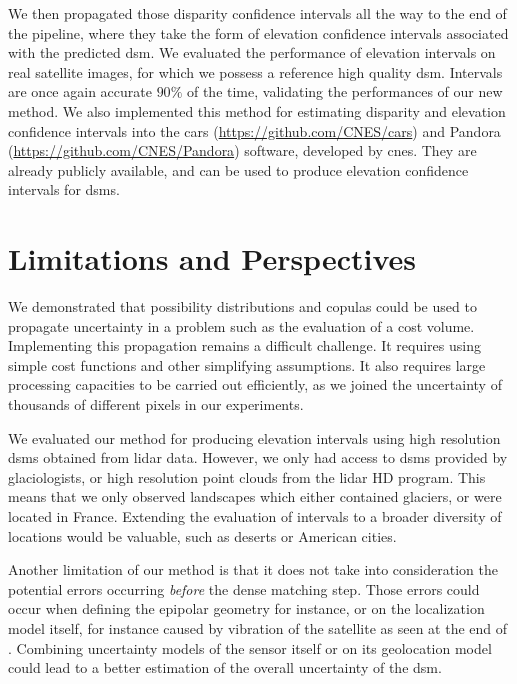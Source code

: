 We then propagated those disparity confidence intervals all the way to the end of the pipeline, where they take the form of elevation confidence intervals associated with the predicted \acrshort{dsm}. We evaluated the performance of elevation intervals on real satellite images, for which we possess a reference high quality \acrshort{dsm}. Intervals are once again accurate $90\%$ of the time, validating the performances of our new method. We also implemented this method for estimating disparity and elevation confidence intervals into the \acrshort{cars} (\url{https://github.com/CNES/cars}) and Pandora (\url{https://github.com/CNES/Pandora}) software, developed by \acrshort{cnes}. They are already publicly available, and can be used to produce elevation confidence intervals for \acrshort{dsm}s.

\section*{Limitations and Perspectives}
We demonstrated that possibility distributions and copulas could be used to propagate uncertainty in a problem such as the evaluation of a cost volume. Implementing this propagation remains a difficult challenge. It requires using simple cost functions and other simplifying assumptions. It also requires large processing capacities to be carried out efficiently, as we joined the uncertainty of thousands of different pixels in our experiments.

We evaluated our method for producing elevation intervals using high resolution \acrshort{dsm}s obtained from \acrshort{lidar} data. However, we only had access to \acrshort{dsm}s provided by glaciologists, or high resolution point clouds from the \acrshort{lidar} HD program. This means that we only observed landscapes which either contained glaciers, or were located in France. Extending the evaluation of intervals to a broader diversity of locations would be valuable, such as deserts or American cities.

Another limitation of our method is that it does not take into consideration the potential errors occurring \textit{before} the dense matching step. Those errors could occur when defining the epipolar geometry for instance, or on the localization model itself, for instance caused by vibration of the satellite as seen at the end of . Combining uncertainty models of the sensor itself or on its geolocation model could lead to a better estimation of the overall uncertainty of the \acrshort{dsm}. 

